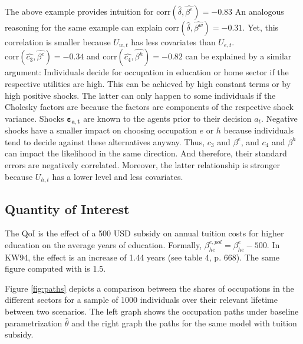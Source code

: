 The above example provides intuition for $\text{corr}(\hat{\delta},\hat{\beta^e})=-0.83$ An analogous reasoning for the same example can explain $\text{corr}(\hat{\delta},\hat{\beta^w})=-0.31$. Yet, this correlation is smaller because $U_{w,t}$ has less covariates than $U_{e,t}$. $\text{corr}(\hat{c_3},\hat{\beta^e})=-0.34$ and $\text{corr}(\hat{c_4},\hat{\beta^h})=-0.82$ can be explained by a similar argument: Individuals decide for occupation in education or home sector if the respective utilities are high. This can be achieved by high constant terms or by high positive shocks. The latter can only happen to some individuals if the Cholesky factors are because the factors are components of the respective shock variance. Shocks $\pmb{\varepsilon_{a,t}}$ are known to the agents prior to their decision $a_t$. Negative shocks have a smaller impact on choosing occupation $e$ or $h$ because individuals tend to decide against these alternatives anyway. Thus, $c_3$ and $\beta^e$, and $c_4$ and $\beta^h$ can impact the likelihood in the same direction. And therefore, their standard errors are negatively correlated. Moreover, the latter relationship is stronger because $U_{h,t}$ has a lower level and less covariates.


\subsection{Quantity of Interest}

The QoI is the effect of a 500 USD subsidy on annual tuition costs for higher education on the average years of education. Formally, $\beta_{he}^{e,pol} = \beta_{he}^e - 500$. In KW94, the effect is an increase of 1.44 years (see table 4, p. 668). The same figure computed with  is 1.5.

Figure \ref{fig:paths} depicts a comparison between the shares of occupations in the different sectors for a sample of 1000 individuals over their relevant lifetime between two scenarios. The left graph shows the occupation paths under baseline parametrization $\hat{\theta}$ and the right graph the paths for the same model with tuition subsidy.

